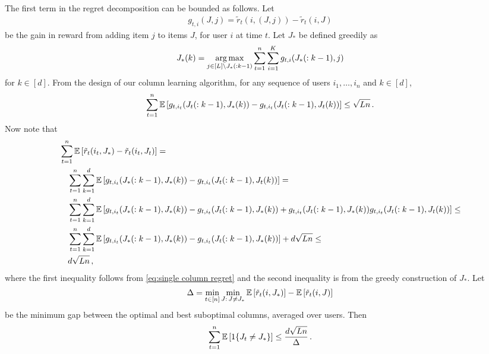 The first term in the regret decomposition can be bounded as follows. Let
\begin{align*}
  g_{t, i}(J, j) =
  \tilde{r}_t(i, (J, j)) - \tilde{r}_t(i, J)
\end{align*}
be the gain in reward from adding item $j$ to items $J$, for user $i$ at time $t$. Let $J_\ast$ be defined greedily as
\begin{align*}
  J_\ast(k) =
  \mathop{\rm arg\,max}_{j \in [L] \setminus J_\ast(: k - 1)} \sum_{t = 1}^n \sum_{i = 1}^K g_{t, i}(J_\ast(: k - 1), j)
\end{align*}
for $k \in [d]$. From the design of our column learning algorithm, for any sequence of users $i_1, \dots, i_n$ and $k \in [d]$,
\begin{align}
  \sum_{t = 1}^n \mathbb{E}\left[g_{t, i_t}(J_t(: k - 1), J_\ast(k)) - g_{t, i_t}(J_t(: k - 1), J_t(k))\right] \leq
  \sqrt{L n}\,.
  \label{eq:single column regret}
\end{align}
Now note that
\begin{align*}
  & \sum_{t = 1}^n \mathbb{E}\left[\tilde{r}_t(i_t, J_\ast) - \tilde{r}_t(i_t, J_t)\right] = \\
  & \quad \sum_{t = 1}^n \sum_{k = 1}^d \mathbb{E}\left[g_{t, i_t}(J_\ast(: k - 1), J_\ast(k)) - g_{t, i_t}(J_t(: k - 1), J_t(k))\right] = \\
  & \quad \sum_{t = 1}^n \sum_{k = 1}^d \mathbb{E}\left[g_{t, i_t}(J_\ast(: k - 1), J_\ast(k)) - g_{t, i_t}(J_t(: k - 1), J_\ast(k)) +
  g_{t, i_t}(J_t(: k - 1), J_\ast(k)) g_{t, i_t}(J_t(: k - 1), J_t(k))\right] \leq \\
  & \quad \sum_{t = 1}^n \sum_{k = 1}^d \mathbb{E}\left[g_{t, i_t}(J_\ast(: k - 1), J_\ast(k)) - g_{t, i_t}(J_t(: k - 1), J_\ast(k))\right] +
  d \sqrt{L n} \leq \\
  & \quad d \sqrt{L n}\,,
\end{align*}
where the first inequality follows from \eqref{eq:single column regret} and the second inequality is from the greedy construction of $J_\ast$.  Let
\begin{align*}
  \Delta =
  \min_{t \in [n]} \min_{J:\, J \neq J_\ast} \mathbb{E}\left[\tilde{r}_t(i, J_\ast)\right] - \mathbb{E}\left[\tilde{r}_t(i, J)\right]
\end{align*}
be the minimum gap between the optimal and best suboptimal columns, averaged over users. Then
\begin{align*}
  \sum_{t = 1}^n \mathbb{E}\left[1\{J_t \neq J_\ast\}\right] \leq
  \frac{d \sqrt{L n}}{\Delta}\,.
\end{align*}
